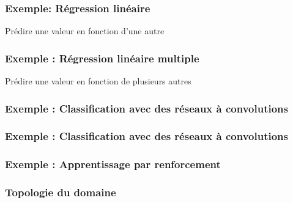 \begin{frame}
  \frametitle{Exemple: Régression linéaire}
  Prédire une valeur en fonction d'une autre

\end{frame}

\begin{frame}
  \frametitle{Exemple : Régression linéaire multiple}
  Prédire une valeur en fonction de plusieurs autres

\end{frame}

\begin{frame}
  \frametitle{Exemple : Classification avec des réseaux à convolutions}
  
\end{frame}

\begin{frame}
  \frametitle{Exemple : Classification avec des réseaux à convolutions}
\end{frame}

\begin{frame}
  \frametitle{Exemple : Apprentissage par renforcement}
\end{frame}

\begin{frame}
  \frametitle{Topologie du domaine}
\end{frame}
